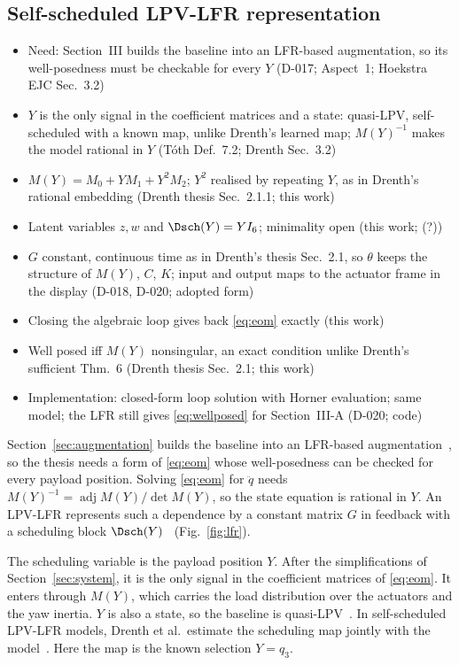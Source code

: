 \subsection{Self-scheduled LPV-LFR representation}\label{sec:lfr}
\ifdraft
\begin{itemize}
\item Need: Section~III builds the baseline into an LFR-based augmentation, so its well-posedness must be checkable for every $Y$ (D-017; Aspect~1; Hoekstra EJC Sec.~3.2)
\item $Y$ is the only signal in the coefficient matrices and a state: quasi-LPV, self-scheduled with a known map, unlike Drenth's learned map; $M(Y)^{-1}$ makes the model rational in $Y$ (T\'oth Def.~7.2; Drenth Sec.~3.2)
\item $M(Y)=M_0+YM_1+Y^2M_2$; $Y^2$ realised by repeating $Y$, as in Drenth's rational embedding (Drenth thesis Sec.~2.1.1; this work)
\item Latent variables $z,w$ and $\Dsch(Y)=YI_6$; minimality open (this work; (?))
\item $G$ constant, continuous time as in Drenth's thesis Sec.~2.1, so $\theta$ keeps the structure of $M(Y)$, $C$, $K$; input and output maps to the actuator frame in the display (D-018, D-020; adopted form)
\item Closing the algebraic loop gives back \eqref{eq:eom} exactly (this work)
\item Well posed iff $M(Y)$ nonsingular, an exact condition unlike Drenth's sufficient Thm.~6 (Drenth thesis Sec.~2.1; this work)
\item Implementation: closed-form loop solution with Horner evaluation; same model; the LFR still gives \eqref{eq:wellposed} for Section~III-A (D-020; code)
\end{itemize}
\fi

Section~\ref{sec:augmentation} builds the baseline into an LFR-based
augmentation~\cite[Sec.~3.2]{hoekstra2025lfr}, so the thesis needs a form of
\eqref{eq:eom} whose well-posedness can be checked for every payload position.
Solving \eqref{eq:eom} for $\ddot q$ needs
$M(Y)^{-1}=\operatorname{adj}M(Y)/\det M(Y)$, so the state equation is
rational in $Y$.
An LPV-LFR represents such a dependence by a constant matrix $G$ in feedback
with a scheduling block $\Dsch(Y)$~\cite[Sec.~2.1]{drenth2025thesis}
(Fig.~\ref{fig:lfr}).

The scheduling variable is the payload position $Y$.
After the simplifications of Section~\ref{sec:system}, it is the only signal
in the coefficient matrices of \eqref{eq:eom}.
It enters through $M(Y)$, which carries the load distribution over the
actuators and the yaw inertia.
$Y$ is also a state, so the baseline is quasi-LPV~\cite[Def.~7.2]{toth2010modeling}.
In self-scheduled LPV-LFR models, Drenth et al.\ estimate the scheduling map
jointly with the model~\cite[Sec.~3.2]{drenth2025lpvlfr}.
Here the map is the known selection $Y=q_3$.

